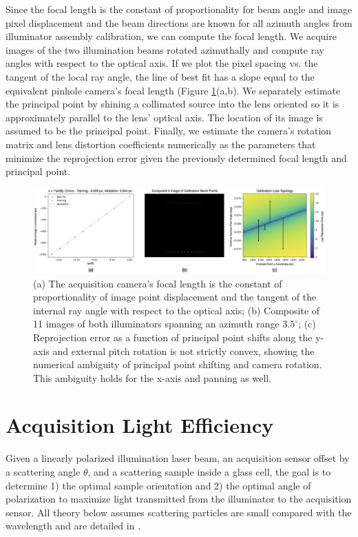 Since the focal length is the constant of proportionality for beam angle and image pixel displacement and the beam directions are known for all azimuth angles from illuminator assembly calibration, we can compute the focal length. We acquire images of the two illumination beams rotated azimuthally and compute ray angles with respect to the optical axis. If we plot the pixel spacing vs. the tangent of the local ray angle, the line of best fit has a slope equal to the equivalent pinhole camera's focal length (Figure \ref{fig:acquisition_camera_calibration}(a,b). We separately estimate the principal point by shining a collimated source into the lens oriented so it is approximately parallel to the lens' optical axis. The location of its image is assumed to be the principal point. Finally, we estimate the camera's rotation matrix and lens distortion coefficients numerically as the parameters that minimize the reprojection error given the previously determined focal length and principal point.
\begin{figure}
    \centering
    \includegraphics[width=\linewidth]{figures/acqusition_camera_calibration.png}
    \caption{(a) The acquisition camera's focal length is the constant of proportionality of image point displacement and the tangent of the internal ray angle with respect to the optical axis; (b) Composite of 11 images of both illuminators spanning an azimuth range $3.5^\circ$; (c) Reprojection error as a function of principal point shifts along the y-axis and external pitch rotation is not strictly convex, showing the numerical ambiguity of principal point shifting and camera rotation. This ambiguity holds for the x-axis and panning as well.}
    \label{fig:acquisition_camera_calibration}
\end{figure}


\section{Acquisition Light Efficiency}
Given a linearly polarized illumination laser beam, an acquisition sensor offset by a scattering angle $\theta$, and a scattering sample inside a glass cell, the goal is to determine 1) the optimal sample orientation and 2) the optimal angle of polarization to maximize light transmitted from the illuminator to the acquisition sensor. All theory below assumes scattering particles are small compared with the wavelength and are detailed in \cite{born2013principles}.

